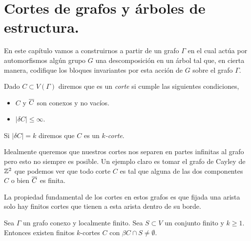 \documentclass[tesis.tex]{subfiles}
\begin{document}
\chapter{Cortes de grafos y árboles de estructura.}

En este capítulo vamos a construirnos a partir de un grafo $\Gamma$ en el cual actúa por automorfismos algún grupo $G$ una descomposición en un árbol tal que, en cierta manera, codifique los bloques invariantes por esta acción de $G$ sobre el grafo $\Gamma$.


\begin{deff}
	Dado $C \subset V(\Gamma)$ diremos que es un \emph{corte} si cumple las siguientes condiciones,
	\begin{itemize}
		\item $C$ y $\overline C$ son conexos y no vacíos.
		\item $|\delta C| \le \infty$.
	\end{itemize}
	Si $|\delta C| = k$ diremos que $C$ es un \emph{$k$-corte}.
\end{deff}	

Idealmente queremos que nuestros cortes nos separen en partes infinitas al grafo pero esto no siempre es posible.
Un ejemplo claro es tomar el grafo de Cayley de $\mathbb{Z}^2$ que podemos ver que todo corte $C$ es tal que alguna de las dos componentes $C$ o bien $\overline C$ es finita.

La propiedad fundamental de los cortes en estos grafos es que fijada una arista solo hay finitos cortes que tienen a esta arista dentro de su borde.
	
\begin{lema}\label{lema_finitos_kcortes}
	Sea $\Gamma$ un grafo conexo y localmente finito.
	Sea $S \subset V$ un conjunto finito y $k\ge 1$.
	Entonces existen finitos $k$-cortes $C$ con $\beta C \cap S \neq \emptyset$.
\end{lema}	
\end{document}
